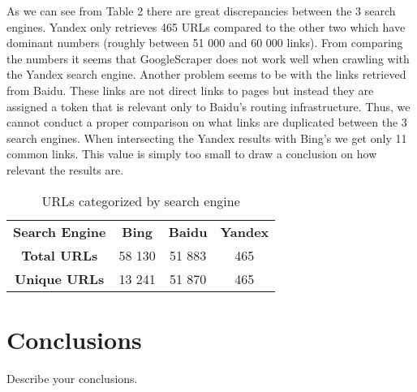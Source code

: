 \documentclass{sig-alternate}
\begin{document}
As we can see from Table 2 there are great discrepancies between the 3 search engines. Yandex only retrieves 465 URLs compared to the other two which have dominant numbers (roughly between 51 000 and 60 000 links). From comparing the numbers it seems that GoogleScraper does not work well when crawling with the Yandex search engine. Another problem seems to be with the links retrieved from Baidu. These links are not direct links to pages but instead they are assigned a token that is relevant only to Baidu's routing infrastructure. Thus, we cannot conduct a proper comparison on what links are duplicated between the 3 search engines. When intersecting the Yandex results with Bing's we get only 11 common links. This value is simply too small to draw a conclusion on how relevant the results are. 

\begin{table}[h]
\centering
\begin{tabular}{|c|c|c|c|}
\hline
\rowcolor[HTML]{343434} 
{\color[HTML]{FFFFFF} \textbf{Search Engine}} & {\color[HTML]{FFFFFF} \textbf{Bing}} & {\color[HTML]{FFFFFF} \textbf{Baidu}} & {\color[HTML]{FFFFFF} \textbf{Yandex}} \\
\textbf{Total URLs}                           & 58 130                               & 51 883                                & 465                                    \\ \hline
\textbf{Unique URLs}                          & 13 241                               & 51 870                                 & 465                                  \\ \hline 
\end{tabular}
\caption{URLs categorized by search engine}
\end{table}



\section{Conclusions}
Describe your conclusions. 



%
%
\end{document}
